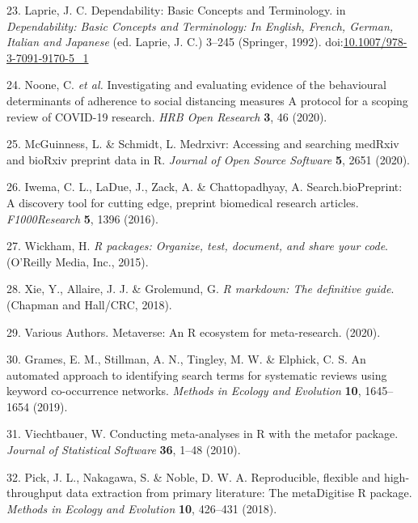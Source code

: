 \documentclass[a4paper, twoside]{templates/ociamthesis}
\begin{document}
\leavevmode\hypertarget{ref-laprie1992}{}%
23. Laprie, J. C. Dependability: Basic Concepts and Terminology. in \emph{Dependability: Basic Concepts and Terminology: In English, French, German, Italian and Japanese} (ed. Laprie, J. C.) 3--245 (Springer, 1992). doi:\href{https://doi.org/10.1007/978-3-7091-9170-5_1}{10.1007/978-3-7091-9170-5\_1}

\leavevmode\hypertarget{ref-noone2020}{}%
24. Noone, C. \emph{et al.} Investigating and evaluating evidence of the behavioural determinants of adherence to social distancing measures A protocol for a scoping review of COVID-19 research. \emph{HRB Open Research} \textbf{3}, 46 (2020).

\leavevmode\hypertarget{ref-mcguinness2020a}{}%
25. McGuinness, L. \& Schmidt, L. Medrxivr: Accessing and searching medRxiv and bioRxiv preprint data in R. \emph{Journal of Open Source Software} \textbf{5}, 2651 (2020).

\leavevmode\hypertarget{ref-iwema2016}{}%
26. Iwema, C. L., LaDue, J., Zack, A. \& Chattopadhyay, A. Search.bioPreprint: A discovery tool for cutting edge, preprint biomedical research articles. \emph{F1000Research} \textbf{5}, 1396 (2016).

\leavevmode\hypertarget{ref-wickham2015r}{}%
27. Wickham, H. \emph{R packages: Organize, test, document, and share your code}. (O'Reilly Media, Inc., 2015).

\leavevmode\hypertarget{ref-xie2018r}{}%
28. Xie, Y., Allaire, J. J. \& Grolemund, G. \emph{R markdown: The definitive guide}. (Chapman and Hall/CRC, 2018).

\leavevmode\hypertarget{ref-variousauthors2020}{}%
29. Various Authors. Metaverse: An R ecosystem for meta-research. (2020).

\leavevmode\hypertarget{ref-grames2019automated}{}%
30. Grames, E. M., Stillman, A. N., Tingley, M. W. \& Elphick, C. S. An automated approach to identifying search terms for systematic reviews using keyword co-occurrence networks. \emph{Methods in Ecology and Evolution} \textbf{10}, 1645--1654 (2019).

\leavevmode\hypertarget{ref-metaforref}{}%
31. Viechtbauer, W. Conducting meta-analyses in R with the metafor package. \emph{Journal of Statistical Software} \textbf{36}, 1--48 (2010).

\leavevmode\hypertarget{ref-pick2018}{}%
32. Pick, J. L., Nakagawa, S. \& Noble, D. W. A. Reproducible, flexible and high-throughput data extraction from primary literature: The metaDigitise R package. \emph{Methods in Ecology and Evolution} \textbf{10}, 426--431 (2018).
\end{document}
